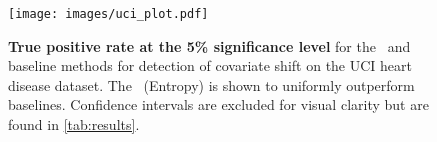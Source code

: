 \begin{figure}[!htb]
    \centering
    \texttt{[image: images/uci\_plot.pdf]}
    \caption{\small \textbf{True positive rate at the 5\% significance level} for the \method\ and baseline methods for detection of covariate shift on the UCI heart disease dataset.
    The \method\ (Entropy) is shown to uniformly outperform baselines.
    Confidence intervals are excluded for visual clarity but are found in \autoref{tab:results}.}
    \label{fig:uci_plot}
\end{figure}

